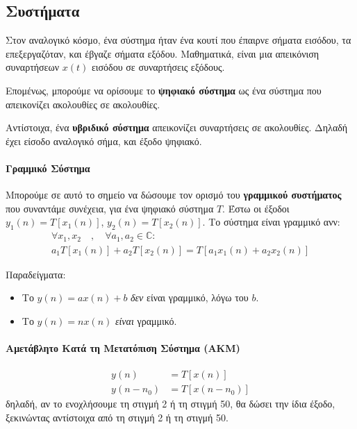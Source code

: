 \documentclass[11pt,a4paper,notitlepage,fleqn]{article}
\begin{document}
\subsection{Συστήματα}
Στον αναλογικό κόσμο, ένα σύστημα ήταν ένα κουτί που έπαιρνε σήματα εισόδου, τα επεξεργαζόταν, και έβγαζε σήματα εξόδου. Μαθηματικά, είναι μια απεικόνιση συναρτήσεων \( x(t) \) εισόδου σε συναρτήσεις εξόδους.

Επομένως, μπορούμε να ορίσουμε το \textbf{ψηφιακό σύστημα} ως ένα σύστημα που απεικονίζει ακολουθίες
σε ακολουθίες.


Αντίστοιχα, ένα \textbf{υβριδικό σύστημα} απεικονίζει συναρτήσεις σε ακολουθίες. Δηλαδή έχει είσοδο αναλογικό σήμα, και έξοδο ψηφιακό.

\paragraph{Γραμμικό Σύστημα}
Μπορούμε σε αυτό το σημείο να δώσουμε τον ορισμό του \textbf{γραμμικού συστήματος} που συναντάμε συνέχεια,
για ένα ψηφιακό σύστημα \( T \). Έστω οι έξοδοι \( y_1(n) = T\left[x_1(n)\right] \),
\( y_2(n) = T\left[x_2(n)\right] \). Το σύστημα είναι γραμμικό ανν:
\begin{gather*}
\forall x_1,x_2\quad,\quad \forall a_1,a_2\in\mathbb C:\\
a_1T\left[x_1(n)\right]+a_2T\left[x_2(n)\right] = T\left[a_1x_1(n)+a_2x_2(n)\right]
\end{gather*}

Παραδείγματα:
\begin{itemize}
	\item Το \( y(n) = ax(n) + b \) \textit{δεν} είναι γραμμικό, λόγω του \( b \).
	\item Το \( y(n) = nx(n) \) \textit{είναι} γραμμικό.
\end{itemize}

\paragraph{Αμετάβλητο Κατά τη Μετατόπιση Σύστημα (ΑΚΜ)}
\begin{align*}
	y(n) &= T\left[x(n)\right] \\
	y(n-n_0) &= T\left[x(n-n_0)\right]
\end{align*}
δηλαδή, αν το ενοχλήσουμε τη στιγμή 2 ή τη στιγμή 50, θα δώσει την ίδια έξοδο, ξεκινώντας αντίστοιχα
από τη στιγμή 2 ή τη στιγμή 50.
\end{document}
